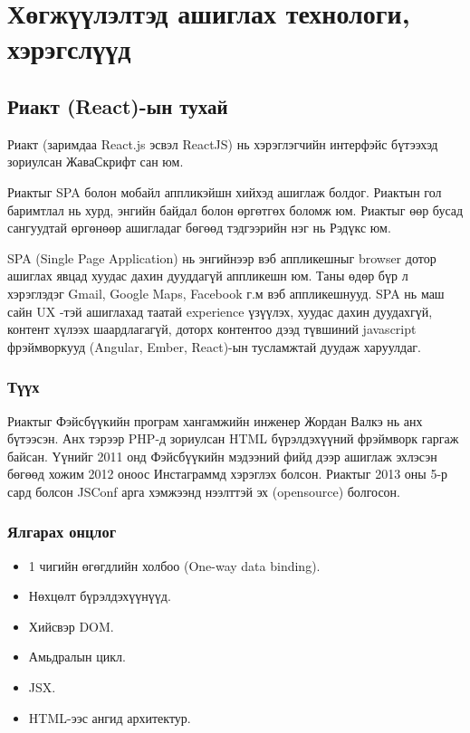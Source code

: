 \section{Хөгжүүлэлтэд ашиглах технологи, хэрэгслүүд}

\subsection{Риакт (React)-ын тухай}
Риакт (заримдаа React.js эсвэл ReactJS) нь хэрэглэгчийн интерфэйс бүтээхэд зориулсан ЖаваСкрифт сан юм.

Риактыг SPA болон мобайл аппликэйшн хийхэд ашиглаж болдог. Риактын гол баримтлал нь хурд, энгийн байдал болон өргөтгөх боломж юм. Риактыг өөр бусад сангуудтай өргөнөөр ашигладаг бөгөөд тэдгээрийн нэг нь Рэдүкс юм.

SPA (Single Page Application) нь энгийнээр вэб аппликешныг browser дотор ашиглах явцад хуудас дахин дууддагүй аппликешн юм. Таны өдөр бүр л хэрэглэдэг Gmail, Google Maps, Facebook г.м вэб аппликешнууд. SPA нь маш сайн UX -тэй ашиглахад таатай experience үзүүлэх, хуудас дахин дуудахгүй, контент хүлээх шаардлагагүй, доторх контентоо дээд түвшиний javascript фрэймворкууд (Angular, Ember, React)-ын тусламжтай дуудаж харуулдаг.

\subsubsection{Түүх}
Риактыг Фэйсбүүкийн програм хангамжийн инженер Жордан Валкэ нь анх бүтээсэн. Анх тэрээр PHP-д зориулсан HTML бүрэлдэхүүний фрэймворк гаргаж байсан. Үүнийг 2011 онд Фэйсбүүкийн мэдээний фийд дээр ашиглаж эхлэсэн бөгөөд хожим 2012 оноос Инстаграммд хэрэглэх болсон. Риактыг 2013 оны 5-р сард болсон JSConf арга хэмжээнд нээлттэй эх (opensource) болгосон.

\subsubsection{Ялгарах онцлог}
\begin{itemize}[label={--}]
    \item 1 чигийн өгөгдлийн холбоо (One-way data binding).
    \item Нөхцөлт бүрэлдэхүүнүүд.
    \item Хийсвэр DOM.
    \item Амьдралын цикл.
    \item JSX.
    \item HTML-ээс ангид архитектур.
\end{itemize}

